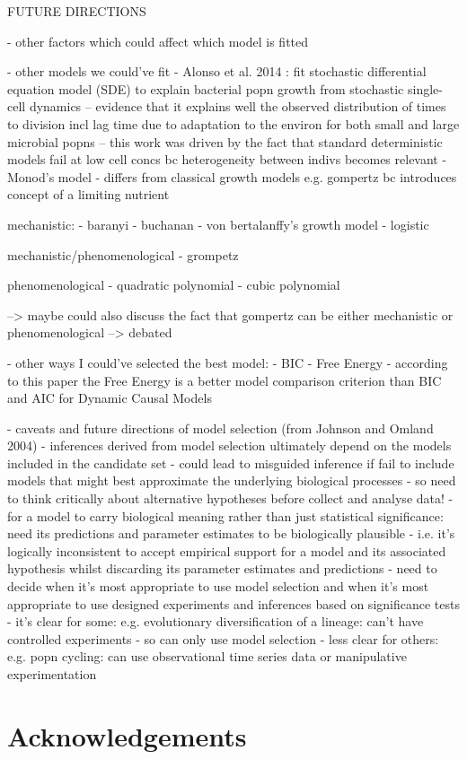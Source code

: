 \documentclass[11pt]{article}
\begin{document}
	
	
	
	FUTURE DIRECTIONS
	
	- other factors which could affect which model is fitted
	
	- other models we could've fit
	- Alonso et al. 2014 \cite{alonso2014modeling}: fit stochastic differential equation model (SDE) to explain bacterial popn growth from stochastic single-cell dynamics -- evidence that it explains well the observed distribution of times to division incl lag time due to adaptation to the environ for both small and large microbial popns -- this work was driven by the fact that standard deterministic models fail at low cell concs bc heterogeneity between indivs becomes relevant
	- Monod's model \cite{lobry1992monod} - differs from classical growth models e.g. gompertz bc introduces concept of a limiting nutrient
	
	mechanistic:
	- baranyi
	- buchanan
	- von bertalanffy's growth model
	- logistic
	
	mechanistic/phenomenological
	- grompetz
	
	phenomenological
	- quadratic polynomial
	- cubic polynomial
	
	--> maybe could also discuss the fact that gompertz can be either mechanistic or phenomenological --> debated
	
	- other ways I could've selected the best model:
	- BIC
	- Free Energy - according to this paper the Free Energy is a better model comparison criterion than BIC and AIC for Dynamic Causal Models \cite{penny2012comparing}
	
	- caveats and future directions of model selection (from Johnson and Omland 2004) \cite{johnson2004model}
	- inferences derived from model selection ultimately depend on the models included in the candidate set
	- could lead to misguided inference if fail to include models that might best approximate the underlying biological processes
	- so need to think critically about alternative hypotheses before collect and analyse data!
	- for a model to carry biological meaning rather than just statistical significance: need its predictions and parameter estimates to be biologically plausible
	- i.e. it's logically inconsistent to accept empirical support for a model and its associated hypothesis whilst discarding its parameter estimates and predictions
	- need to decide when it's most appropriate to use model selection and when it's most appropriate to use designed experiments and inferences based on significance tests
	- it's clear for some: e.g. evolutionary diversification of a lineage: can't have controlled experiments - so can only use model selection 
	- less clear for others: e.g. popn cycling: can use observational time series data or manipulative experimentation
	
	
	
	\section{Acknowledgements}
	
	
	
\end{document}

